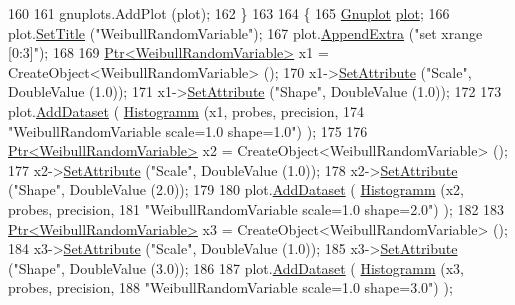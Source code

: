\begin{DoxyCode}
160 
161     gnuplots.AddPlot (plot);
162   \}
163 
164   \{
165     \hyperlink{classns3_1_1Gnuplot}{Gnuplot} \hyperlink{lte__amc_8m_a5942306abe9f005572e4344e3cdef528}{plot};
166     plot.\hyperlink{classns3_1_1Gnuplot_ac01f15633d49f0239f8a45293a1e04f0}{SetTitle} (\textcolor{stringliteral}{"WeibullRandomVariable"});
167     plot.\hyperlink{classns3_1_1Gnuplot_a649a3041b9d0ea21a212b5ad9b28ecbf}{AppendExtra} (\textcolor{stringliteral}{"set xrange [0:3]"});
168 
169     \hyperlink{classns3_1_1Ptr}{Ptr<WeibullRandomVariable>} x1 = CreateObject<WeibullRandomVariable> ();
170     x1->\hyperlink{classns3_1_1ObjectBase_ac60245d3ea4123bbc9b1d391f1f6592f}{SetAttribute} (\textcolor{stringliteral}{"Scale"}, DoubleValue (1.0));
171     x1->\hyperlink{classns3_1_1ObjectBase_ac60245d3ea4123bbc9b1d391f1f6592f}{SetAttribute} (\textcolor{stringliteral}{"Shape"}, DoubleValue (1.0));
172 
173     plot.\hyperlink{classns3_1_1Gnuplot_a306ec724a327cf9ab699700f31fca0a1}{AddDataset} ( \hyperlink{main-random-variable-stream_8cc_a2cfd3837ab3f2e816cf53486d7a186b5}{Histogramm} (x1, probes, precision,
174                                   \textcolor{stringliteral}{"WeibullRandomVariable scale=1.0 shape=1.0"}) );
175 
176     \hyperlink{classns3_1_1Ptr}{Ptr<WeibullRandomVariable>} x2 = CreateObject<WeibullRandomVariable> ();
177     x2->\hyperlink{classns3_1_1ObjectBase_ac60245d3ea4123bbc9b1d391f1f6592f}{SetAttribute} (\textcolor{stringliteral}{"Scale"}, DoubleValue (1.0));
178     x2->\hyperlink{classns3_1_1ObjectBase_ac60245d3ea4123bbc9b1d391f1f6592f}{SetAttribute} (\textcolor{stringliteral}{"Shape"}, DoubleValue (2.0));
179 
180     plot.\hyperlink{classns3_1_1Gnuplot_a306ec724a327cf9ab699700f31fca0a1}{AddDataset} ( \hyperlink{main-random-variable-stream_8cc_a2cfd3837ab3f2e816cf53486d7a186b5}{Histogramm} (x2, probes, precision,
181                                   \textcolor{stringliteral}{"WeibullRandomVariable scale=1.0 shape=2.0"}) );
182 
183     \hyperlink{classns3_1_1Ptr}{Ptr<WeibullRandomVariable>} x3 = CreateObject<WeibullRandomVariable> ();
184     x3->\hyperlink{classns3_1_1ObjectBase_ac60245d3ea4123bbc9b1d391f1f6592f}{SetAttribute} (\textcolor{stringliteral}{"Scale"}, DoubleValue (1.0));
185     x3->\hyperlink{classns3_1_1ObjectBase_ac60245d3ea4123bbc9b1d391f1f6592f}{SetAttribute} (\textcolor{stringliteral}{"Shape"}, DoubleValue (3.0));
186 
187     plot.\hyperlink{classns3_1_1Gnuplot_a306ec724a327cf9ab699700f31fca0a1}{AddDataset} ( \hyperlink{main-random-variable-stream_8cc_a2cfd3837ab3f2e816cf53486d7a186b5}{Histogramm} (x3, probes, precision,
188                                   \textcolor{stringliteral}{"WeibullRandomVariable scale=1.0 shape=3.0"}) );

\end{DoxyCode}
